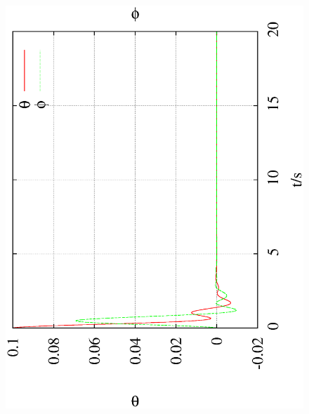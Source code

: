 \documentclass[10pt,a4paper]{article}
\begin{document}
\begin{figure}[h!]
\begin{center}
\includegraphics[scale = 0.2, angle =-90]{0.001_1_1_theta_phi.eps}

\end{center}
\end{figure}
\end{document}
